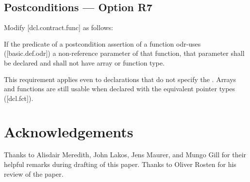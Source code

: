 \subsection*{Postconditions --- Option R7}

Modify [dcl.contract.func] as follows:

\begin{adjustwidth}{0.5cm}{0.5cm}
If the predicate of a postcondition assertion of a function odr-uses ([basic.def.odr]) a
non-reference parameter of that function, that parameter shall be declared  and shall not have array or function type.
\begin{note}
This requirement applies even to declarations
that do not specify the . Arrays and functions are still usable when declared with the equivalent pointer types ([dcl.fct]).
\end{note}
\begin{example}
\tcode{[...]}
\end{example}

\end{adjustwidth}


\section*{Acknowledgements}
Thanks to Alisdair Meredith, John Lakos, Jens Maurer, and Mungo Gill for their helpful remarks during drafting of this paper. Thanks to Oliver Rosten for his review of the paper.


\renewcommand{\addcontentsline}[3]{}%







